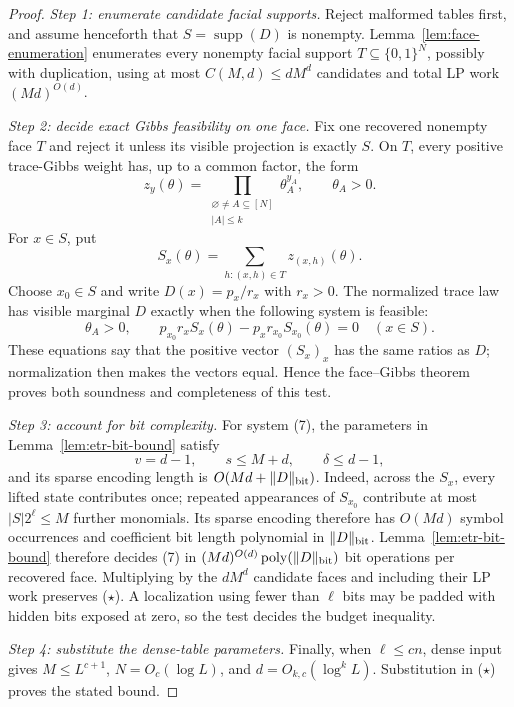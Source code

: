 \documentclass{article}
\newcommand{\supp}{\operatorname{supp}}
\newcommand{\bits}{\{0,1\}}
\begin{document}
\begin{proof}
\emph{Step 1: enumerate candidate facial supports.}
Reject malformed tables first, and assume henceforth that
$S=\supp(D)$ is nonempty.  Lemma~\ref{lem:face-enumeration} enumerates every
nonempty facial support $T\subseteq\bits^N$, possibly with duplication, using
at most $C(M,d)\le dM^d$ candidates and total LP work $(Md)^{O(d)}$.

\emph{Step 2: decide exact Gibbs feasibility on one face.}
Fix one recovered nonempty face $T$ and reject it unless its visible
projection is exactly $S$.  On $T$, every positive trace-Gibbs weight has,
up to a common factor, the form
\[
  z_y(\theta)=
  \prod_{\substack{\varnothing\ne A\subseteq[N]\\|A|\le k}}
  \theta_A^{y_A},
  \qquad \theta_A>0.
\]
For $x\in S$, put
\[
  S_x(\theta)=\sum_{h:(x,h)\in T}z_{(x,h)}(\theta).
\]
Choose $x_0\in S$ and write $D(x)=p_x/r_x$ with $r_x>0$.  The normalized
trace law has visible marginal $D$ exactly when the following system is
feasible:
\[
  \theta_A>0,\qquad
  p_{x_0}r_xS_x(\theta)-p_xr_{x_0}S_{x_0}(\theta)=0
  \quad(x\in S).
  \tag{7}
\]
These equations say that the positive vector $(S_x)_x$ has the same ratios as
$D$; normalization then makes the vectors equal.  Hence the face--Gibbs
theorem proves both soundness and completeness of this test.

\emph{Step 3: account for bit complexity.}
For system (7), the parameters in Lemma~\ref{lem:etr-bit-bound} satisfy
\[
  v=d-1,\qquad s\le M+d,\qquad \delta\le d-1,
\]
and its sparse encoding length is
$O(Md+\lVert D\rVert_{\rm bit})$.  Indeed, across the
$S_x$, every lifted state contributes once; repeated appearances of
$S_{x_0}$ contribute at most $|S|2^\ell\le M$ further monomials.  Its sparse
encoding therefore has $O(Md)$ symbol occurrences and coefficient bit length
polynomial in $\lVert D\rVert_{\rm bit}$.  Lemma~\ref{lem:etr-bit-bound}
therefore decides (7) in
$(Md)^{O(d)}\operatorname{poly}(\lVert D\rVert_{\rm bit})$ bit operations
per recovered face.  Multiplying by the $dM^d$ candidate faces and including
their LP work preserves (\(\star\)).  A localization using
fewer than $\ell$ bits may be padded with hidden bits exposed at zero, so the
test decides the budget inequality.

\emph{Step 4: substitute the dense-table parameters.}
Finally, when $\ell\le cn$, dense input gives $M\le L^{c+1}$,
$N=O_c(\log L)$, and $d=O_{k,c}(\log^kL)$.  Substitution in
(\(\star\)) proves the stated bound.
\end{proof}
\end{document}
